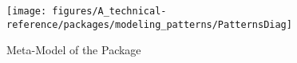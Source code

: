 %
%

\begin{figure}[htbp]
  \centering
  \texttt{[image: figures/A\_technical-reference/packages/modeling\_patterns/PatternsDiag]}
  \caption{Meta-Model of the  Package}
  \label{fig:MM:patterns}
\end{figure}
